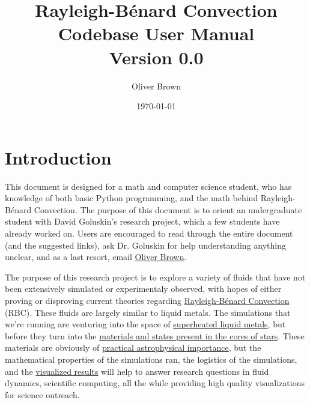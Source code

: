 \documentclass[12pt,a4paper]{report}
\title{
    \vspace{2in}
    \Huge\textbf{Rayleigh-Bénard Convection Codebase User Manual} \\
    \vspace{0.5in}
    \Large Version 0.0
}
\author{Oliver Brown}
\date{\today}
\begin{document}
\maketitle
\thispagestyle{empty}
\clearpage

\tableofcontents
\clearpage


\chapter{Introduction}

	This document is designed for a math and computer science student, who has knowledge of both basic Python programming, and the math behind Rayleigh-Bénard Convection. The purpose of this document is to orient an undergraduate student with David Goluskin's research project, which a few students have already worked on. Users are encouraged to read through the entire document (and the suggested links), ask Dr. Goluskin for help understanding anything unclear, and as a last resort, email \href{mailto:ob583606@gmail.com}{Oliver Brown}.

	The purpose of this research project is to explore a variety of fluids that have not been extensively simulated or experimentaly observed, with hopes of either proving or disproving current theories regarding \href{https://en.wikipedia.org/wiki/Rayleigh-Bénard_convection}{Rayleigh-Bénard Convection} (RBC). These fluids are largely similar to liquid metals. The simulations that we're running are venturing into the space of \href{https://www.nuclear-power.com/nuclear-engineering/heat-transfer/introduction-to-heat-transfer/characteristic-numbers/what-is-prandtl-number/prandtl-number-of-liquid-metals/}{superheated liquid metals}, but before they turn into the \href{https://arxiv.org/pdf/2103.14214}{materials and states present in the cores of stars}. These materials are obviously of \href{https://www.youtube.com/watch?v=OxIX3IHUAGM}{practical astrophysical importance}, but the mathematical properties of the simulations ran, the logistics of the simulations, and the \href{https://dedalus-project.org/gallery/}{visualized results} will help to answer research questions in fluid dynamics, scientific computing, all the while providing high quality visualizations for science outreach.
\end{document}
